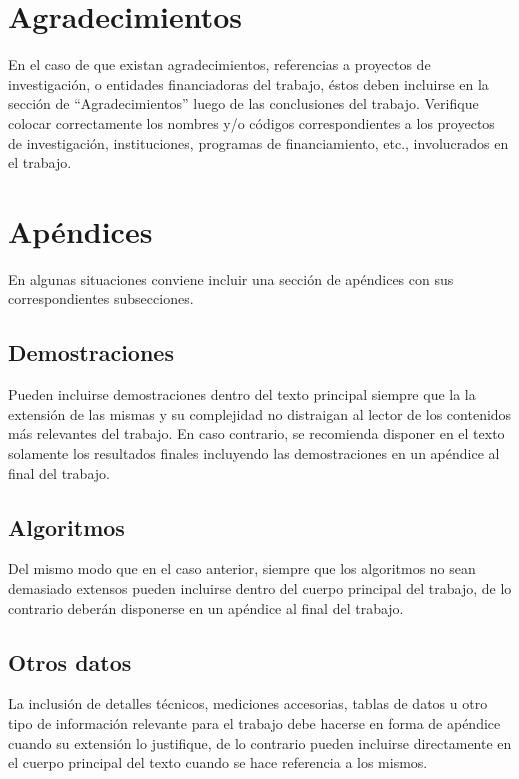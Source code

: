 \documentclass[esp]{FCEFyN-class}
\begin{document}
\section{Agradecimientos}
En el caso de que existan agradecimientos, referencias a proyectos de investigación, o entidades 
financiadoras del trabajo, éstos deben incluirse en la sección de ``Agradecimientos'' luego de las
conclusiones del trabajo.
Verifique colocar correctamente los nombres y/o códigos correspondientes a los proyectos de
investigación, instituciones, programas de financiamiento, etc., involucrados en el trabajo.

\appendix
\section{Apéndices}
En algunas situaciones conviene incluir una sección de apéndices con sus correspondientes subsecciones.

\subsection{Demostraciones}
Pueden incluirse demostraciones dentro del texto principal siempre que la la extensión de las mismas 
y su complejidad no distraigan al lector de los contenidos más relevantes del trabajo. En caso
contrario, se recomienda disponer en el texto solamente los resultados finales incluyendo las
demostraciones en un apéndice al final del trabajo.

\subsection{Algoritmos}
Del mismo modo que en el caso anterior, siempre que los algoritmos no sean demasiado extensos pueden
incluirse dentro del cuerpo principal del trabajo, de lo contrario deberán disponerse en un apéndice
al final del trabajo.

\subsection{Otros datos}
La inclusión de detalles técnicos, mediciones accesorias, tablas de datos u otro tipo de información
relevante para el trabajo debe hacerse en forma de apéndice cuando su extensión lo justifique, de lo
contrario pueden incluirse directamente en el cuerpo principal del texto cuando se hace referencia a
los mismos.

\end{document}
